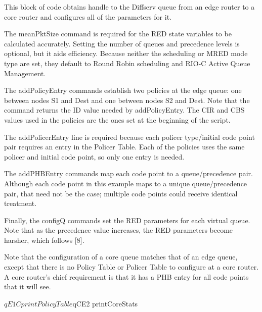 This block of code obtains handle to the Diffserv queue from an edge router to
a core router and configures all of the parameters for it.

The meanPktSize command is required for the RED state variables to be calculated
accurately.  Setting the number of queues and precedence levels is optional, but
it aids efficiency. Because neither the scheduling or MRED mode type are set, 
they default to Round Robin scheduling and RIO-C Active Queue Management.

The addPolicyEntry commands establish two policies at the edge queue: one 
between nodes S1 and Dest and one between nodes S2 and Dest.  Note that the 
\code{[$s1 id]} command returns the ID value needed by addPolicyEntry.  The CIR and CBS values used in the policies are the ones set at the beginning of the script.

The addPolicerEntry line is required because each policer type/initial code point pair requires an entry in the Policer Table.  Each of the policies uses the same policer and initial code point, so only one entry is needed.

The addPHBEntry commands map each code point to a queue/precedence pair.  Although each code point in this example maps to a unique queue/precedence pair, that need not be the case; multiple code points could receive identical treatment.

Finally, the configQ commands set the RED parameters for each virtual queue.  Note that as the precedence value increases, the RED parameters become harsher, which follows [8].


Note that the configuration of a core queue matches that of an edge queue, except that there is no Policy Table or Policer Table to configure at a core router.  A core router's chief requirement is that it has a PHB entry for all code points that it will see.

\begin{program}
$qE1C printPolicyTable
$qCE2 printCoreStats
\end{program}


